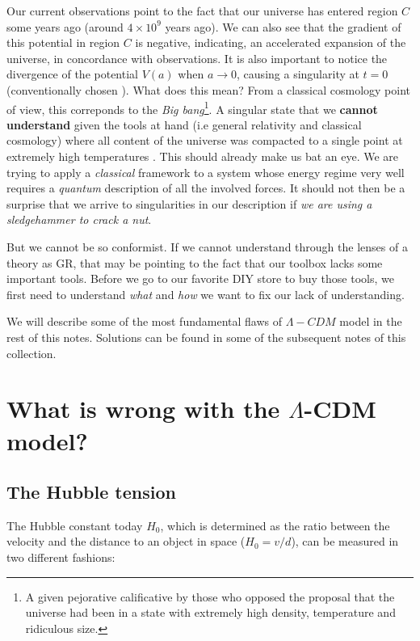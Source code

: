 \documentclass[11pt, a4paper]{article} %
\begin{document}
Our current observations point to the fact that our universe has entered region $C$ some years ago (around $4\times 10^{9}$ years ago). We can also see that the gradient of this potential in region $C$ is negative, indicating, an accelerated expansion of the universe, in concordance with observations. It is also important to notice the divergence of the potential $V(a)$ when $a \rightarrow 0$, causing a singularity at $t=0$ (conventionally chosen \cite{hawking1970singularities}). What does this mean? From a classical cosmology point of view, this correponds to the \textit{Big bang}\footnote{A given pejorative calificative by those who opposed the proposal that the universe had been in a state with extremely high density, temperature and ridiculous size.}. A singular state that we \textbf{cannot understand} given the tools at hand (i.e general relativity and classical cosmology) where all content of the universe was compacted to a single point at extremely high temperatures \cite{lemaitre1950primeval}. This should already make us bat an eye. We are trying to apply a \textit{classical} framework to a system whose energy regime very well requires a \textit{quantum} description of all the involved forces. It should not then be a surprise that we arrive to singularities in our description if \textit{we are using a sledgehammer to crack a nut}.

But we cannot be so conformist. If we cannot understand through the lenses of a theory as GR, that may be pointing to the fact that our toolbox lacks some important tools. Before we go to our favorite DIY store to buy those tools, we first need to understand \textit{what} and \textit{how} we want to fix our lack of understanding.

We will describe some of the most fundamental flaws of $\Lambda-CDM$ model in the rest of this notes. Solutions can be found in some of the subsequent notes of this collection.

\section*{What is wrong with the $\Lambda$-CDM model?}


\subsection*{The Hubble tension}

The Hubble constant today $H_{0}$, which is determined as the ratio between the velocity and the distance to an object in space ($H_{0} = v/d$), can be measured in two different fashions:
\end{document}
